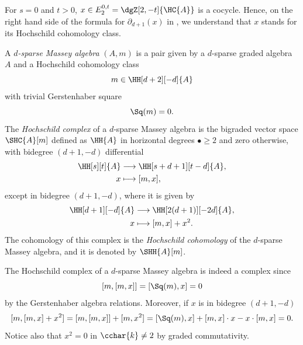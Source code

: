 \documentclass[a4paper]{amsart}
\begin{document}
\begin{remark}
  For $s=0$ and $t>0$, $x\in E^{0,t}_2=\dgZ[2,-t]{\HC{A}}$ is a cocycle. Hence, on the right hand side of the formula for $\partial_{d+1}(x)$ in , we understand that $x$ stands for its Hochschild cohomology class.
\end{remark}

\begin{definition}\label{def:Massey_algebra}
  A \emph{$d$-sparse Massey algebra} $(A,m)$ is a pair given by a $d$-sparse graded algebra $A$ and a Hochschild cohomology class
  \[m\in\HH[d+2][-d]{A}\]
  with trivial Gerstenhaber square
  \[\Sq(m)=0.\]
  The \emph{Hochschild complex} of a $d$-sparse Massey algebra is the bigraded vector space $\SHC{A}[m]$ defined as $\HH{A}$ in horizontal degrees $\bullet\geq 2$ and zero otherwise, with bidegree $(d+1,-d)$ differential 
  \begin{align*}
    \HH[s][t]{A}&\longrightarrow\HH[s+d+1][t-d]{A},\\
    x&\longmapsto [m,x],
  \end{align*}
  except in bidegree $(d+1,-d)$, where it is given by
  \begin{align*}
    \HH[d+1][-d]{A}&\longrightarrow\HH[2(d+1)][-2d]{A},\\
    x&\longmapsto [m,x]+x^2.
  \end{align*}
  The cohomology of this complex is the \emph{Hochschild cohomology} of the $d$-sparse Massey algebra, and it is denoted by $\SHH{A}[m]$.
\end{definition}

\begin{remark}
  \label{rmk:massey_algebra}
  The Hochschild complex of a $d$-sparse Massey algebra is indeed a complex since 
  \[[m,[m,x]]=[\Sq(m),x]=0\]
  by the Gerstenhaber algebra relations. Moreover, if $x$ is in bidegree $(d+1,-d)$
  \[[m,[m,x]+x^2]=[m,[m,x]]+[m,x^2]=[\Sq(m),x]+[m,x]\cdot x-x\cdot [m,x]=0.\]
  Notice also that $x^2=0$ in $\cchar{k}\neq 2$ by graded commutativity.
\end{remark}
\end{document}
